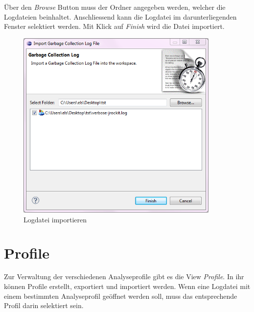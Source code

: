 Über den \textit{Browse} Button muss der Ordner angegeben werden, welcher die Logdateien beinhaltet. Anschliessend kann die Logdatei im darunterliegenden Fenster selektiert werden. Mit Klick auf \textit{Finish} wird die Datei importiert.
 \begin{figure}[H]
  	\centering
    	\includegraphics[width=10cm]{images/tutorial_importlog}
        	\caption{Logdatei importieren}
\end{figure}

\section*{Profile}
Zur Verwaltung der verschiedenen Analyseprofile gibt es die View \textit{Profile}. In ihr können Profile erstellt, exportiert und importiert werden. Wenn eine Logdatei mit einem bestimmten Analyseprofil geöffnet werden soll, muss das entsprechende Profil darin selektiert sein.

